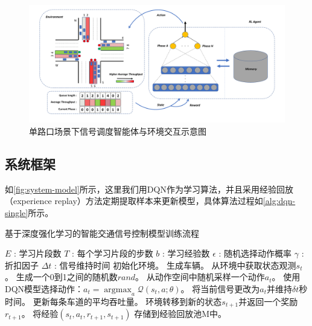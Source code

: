 \begin{figure}[htb]
  \includegraphics[width=1.0\textwidth]{fig/sysmodel.pdf}
  \caption{单路口场景下信号调度智能体与环境交互示意图}
  \label{fig:system-model}
\end{figure}

\subsection{系统框架}
如\autoref{fig:system-model}所示，这里我们用DQN作为学习算法，并且采用经验回放\cite{mnih2015human}（experience replay）方法定期提取样本来更新模型，具体算法过程如\autoref{alg:dqn-single}所示。
\begin{breakablealgorithm}
    \caption{基于深度强化学习的智能交通信号控制模型训练流程}
    \label{alg:dqn-single}
    \begin{algorithmic}[1] %
        \Require 
        $E$ : 学习片段数 \newline
        $T$ : 每个学习片段的步数 \newline
        $b$ : 学习经验数 \newline
        $\epsilon$ : 随机选择动作概率 \newline
        $\gamma$ : 折扣因子 \newline
        $\Delta t$ : 信号维持时间
            \State 初始化环境。
            \State 生成车辆。
                \State 从环境中获取状态观测$s_t$。
                \State 生成一个0到1之间的随机数$rand$。
                    \State 从动作空间中随机采样一个动作$a_t$。
                \Else
                    \State 使用DQN模型选择动作：$a_t = \mathop{\arg\max}_a \mathcal{Q}(s_t,a;\theta)$。
                \EndIf
                \State 将当前信号更改为$a_t$并维持$\delta t$秒时间。
                \State 更新每条车道的平均吞吐量。
                \State 环境转移到新的状态$s_{t+1}$并返回一个奖励$r_{t+1}$。
                \State 将经验$(s_t,a_t,r_{t+1},s_{t+1})$ 存储到经验回放池M中。
                \EndIf
            \EndFor
        \EndFor  
    \end{algorithmic}  
\end{breakablealgorithm}  

